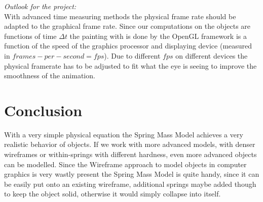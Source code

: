 \documentclass[11pt]{article}
\begin{document}
\textit{Outlook for the project:}\\
With advanced time measuring methods the physical frame rate should be adapted to the graphical frame rate. Since our computations on the objects are functions of time $\Delta t$ the painting with is done by the OpenGL framework is a function of the speed of the graphics processor and displaying device (measured in $frames-per-second=fps$). Due to different $fps$ on different devices the physical framerate has to be adjusted to fit what the eye is seeing to improve the smoothness of the animation.\\[1em]
%

\section{Conclusion}
With a very simple physical equation the Spring Mass Model achieves a very realistic behavior of objects. If we work with more advanced models, with denser wireframes or within-springs with different hardness, even more advanced objects can be modelled. Since the Wireframe approach to model objects in computer graphics is very wastly present the Spring Mass Model is quite handy, since it can be easily put onto an existing wireframe, additional springs maybe added though to keep the object solid, otherwise it would simply collapse into itself.
%


%
%
\newpage
\nocite{hill}
\nocite{rogersadams}
\nocite{dam}
\nocite{PBDM}
\nocite{baker}
\nocite{bakerGL}
\nocite{IASDO}
\nocite{LSCS}
\nocite{DCMSM}
\nocite{gama}
\nocite{wiki}
\nocite{hair}
\nocite{pyGL}



%
%
\end{document}
